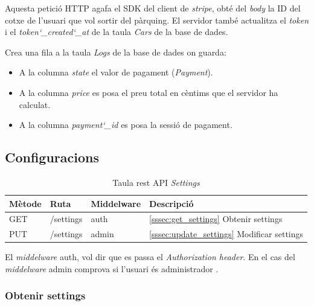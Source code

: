 Aquesta petició HTTP agafa el SDK del client de \emph{stripe}, obté del
\emph{body} la ID del cotxe de l'usuari que vol sortir del pàrquing. El servidor
també actualitza el \emph{token} i el \emph{token\char`_created\char`_at} de la taula
\emph{Cars} de la base de dades.

Crea una fila a la taula \emph{Logs} de la base de dades on guarda:
\begin{itemize}
    \item A la columna \emph{state} el valor de pagament (\emph{Payment}).
    \item A la columna \emph{price} es posa el preu total en cèntims que el servidor ha calculat.
    \item A la columna \emph{payment\char`_id} es posa la sessió de pagament.
\end{itemize}

\subsection{Configuracions}


\begin{table}[H]
\centering
\begin{tabular}{llll}
\hline
\textbf{Mètode} & \textbf{Ruta} & \textbf{Middelware} & \textbf{Descripció} \\ \hline
GET             & /settings   & auth & \autoref{sssec:get_settings}{ Obtenir settings}     \\ \hline
PUT             & /settings   & admin &  \autoref{sssec:update_settings}{ Modificar settings}     \\ \hline
\end{tabular}
\caption{Taula rest API \emph{Settings}}
\label{tab:my-settings-api-table}
\end{table}

El \emph{middelware} auth, vol dir que es passa el \emph{Authorization header}.
En el cas del \emph{middelware} admin comprova si l'usuari és administrador \autocite{middleware_laravel}.


\subsubsection{Obtenir settings}
\label{sssec:get_settings}

